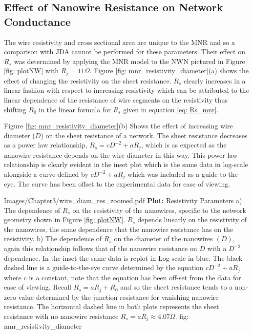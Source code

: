 \subsection{Effect of Nanowire Resistance on Network Conductance}
The wire resistivity and cross sectional area are unique to the MNR and so a comparison with JDA cannot be performed for these parameters. Their effect on $R_s$ was determined by applying the MNR model to the NWN pictured in Figure \ref{fig: plotNW} with $R_j =11 \Omega$. Figure \ref{fig: mnr_resistivity_diameter}(a) shows the effect of changing the resistivity on the sheet resistance. $R_s$ clearly increases in a linear fashion with respect to increasing resistivity which can be attributed to the linear dependence of the resistance of wire segments on the resistivity thus shifting $R_0$ in the linear formula for $R_s$ given in equation \ref{eq: Rs_mnr}. 

Figure \ref{fig: mnr_resistivity_diameter}(b) Shows the effect of increasing wire diameter ($D$) on the sheet resistance of a network. The sheet resistance decreases as a power law relationship, $R_s = c D^{-2} + aR_j$, which is as expected as the nanowire resistance depends on the wire diameter in this way. This power-law relationship is clearly evident in the inset plot which is the same data in log-scale alongside a curve defined by $c D^{-2} + aR_j$ which was included as a guide to the eye. The curve has been offset to the experimental data for ease of viewing. 

{Images/Chapter3/wire_diam_res_zoomed.pdf}
{\textbf{Plot:} Resistivity Parameters}
{a) The dependence of $R_s$ on the resistivity of the nanowires, specific to the network geometry shown in Figure \ref{fig: plotNW}. $R_s$ depends linearly on the resistivity of the nanowires, the same dependence that the nanowire resistance has on the resistivity. b) The dependence of $R_s$ on the diameter of the nanowires $(D)$, again this relationship follows that of the nanowire resistance on $D$ with a $D^{-2}$ dependence. In the inset the same data is replot in Log-scale in blue. The black dashed line is a guide-to-the-eye curve determined by the equation $c D^{-2} + a R_j$ where c is a constant, note that the equation has been off-set from the data for ease of viewing. Recall $R_s = a R_j + R_0$ and so the sheet resistance tends to a non-zero value determined by the junction resistance for vanishing nanowire resistance. The horizontal dashed line in both plots represents the sheet resistance with no nanowire resistance $R_s = aR_j \approx 4.07 \Omega$.}
{fig: mnr_resistivity_diameter}

